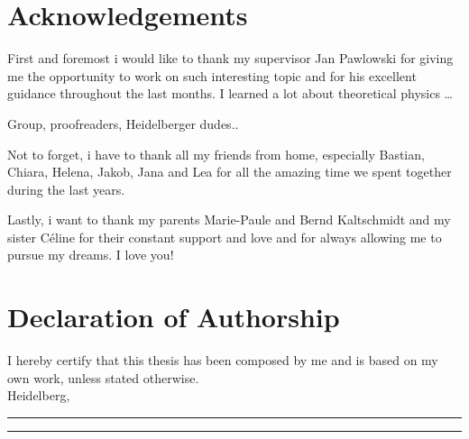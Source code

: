 \thispagestyle{plain}
\section*{Acknowledgements}
First and foremost i would like to thank my supervisor Jan Pawlowski for giving me the opportunity to work on such interesting topic and for his excellent guidance throughout the last months. I learned a lot about theoretical physics \dots

Group, proofreaders, Heidelberger dudes..


Not to forget, i have to thank all my friends from home, especially Bastian, Chiara, Helena, Jakob, Jana and Lea for all the amazing time we spent together during the last years. 

Lastly, i want to thank my parents Marie-Paule and Bernd Kaltschmidt and my sister C\'{e}line for their constant support and love and for always allowing me to pursue my dreams. I love you!  %
 

\section*{Declaration of Authorship}
I hereby certify that this thesis has been composed by me and is based on my own work, unless stated otherwise.\\

Heidelberg, \rule{30mm}{.15mm} \hfill \rule{50mm}{.15mm} \par


